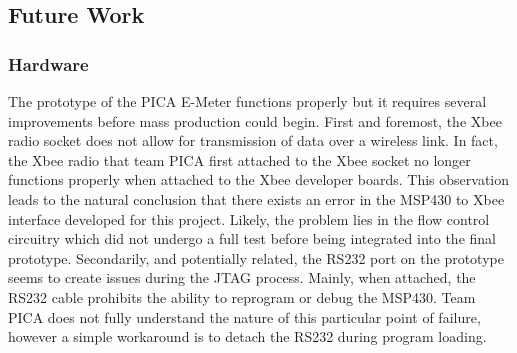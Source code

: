 \subsection{Future Work}

\subsubsection{Hardware}
The prototype of the PICA E-Meter functions properly but it requires several improvements before mass production could begin. First and foremost, the Xbee radio socket does not allow for transmission of data over a wireless link. In fact, the Xbee radio that team PICA first attached to the Xbee socket no longer functions properly when attached to the Xbee developer boards. This observation leads to the natural conclusion that there exists an error in the MSP430 to Xbee interface developed for this project. Likely, the problem lies in the flow control circuitry which did not undergo a full test before being integrated into the final prototype. Secondarily, and potentially related, the \ac{RS232} port on the prototype seems to create issues during the \ac{JTAG} process. Mainly, when attached, the \ac{RS232} cable prohibits the ability to reprogram or debug the MSP430. Team PICA does not fully understand the nature of this particular point of failure, however a simple workaround is to detach the \ac{RS232} during program loading.

